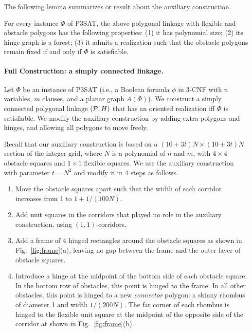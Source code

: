 \documentclass{llncs}
\newcommand{\PP}{{\cal P}} %
\begin{document}
The following lemma summarizes or result about the auxiliary construction.
\begin{lemma}\label{lem:aux}
For every instance $\Phi$ of P3SAT, the above polygonal linkage with flexible and obstacle polygons
has the following properties: (1) it has polynomial size; (2) its hinge graph is a forest;
(3) it admits a realization such that the obstacle polygons remain fixed if and only if $\Phi$ is satisfiable.
\end{lemma}

\paragraph{Full Construction: a simply connected linkage.}
Let $\Phi$ be an instance of P3SAT (i.e., a Boolean formula $\phi$
in 3-CNF with $n$ variables, $m$ clauses, and a planar graph $A(\Phi)$).
We construct a simply connected polygonal linkage $(\PP,H)$ that has an oriented
realization iff $\Phi$ is satisfiable. We modify the auxiliary construction
by adding extra polygons and hinges, and allowing all polygons to move freely.

Recall that our auxiliary construction is based on a $(10+3t)N\times (10+3t)N$ section of the integer grid, where $N$ is a polynomial of $n$ and $m$, with $4\times 4$ obstacle squares and $1\times 1$ flexible squares. We use the auxiliary construction with parameter $t=N^2$ and modify it in 4 steps as follows.

\begin{enumerate}
\item Move the obstacle squares apart such that the width of each corridor increases from 1 to $1+1/(100N)$.
\item Add unit squares in the corridors that played no role in the auxiliary construction, using $(1,1)$-corridors.
\item Add a frame of 4 hinged rectangles around the obstacle squares as shown in Fig.~\ref{fig:frame}(a),
leaving no gap between the frame and the outer layer of obstacle squares.
\item Introduce a hinge at the midpoint of the bottom side of each obstacle square.
In the bottom row of obstacles, this point is hinged to the frame.
In all other obstacles, this point is hinged to a new \emph{connector}
polygon: a skinny rhombus of diameter 1 and width $1/(200N)$.
The far corner of each rhombus is hinged to the flexible unit square
at the midpoint of the opposite side of the corridor at shown
in Fig.~\ref{fig:frame}(b).
\end{enumerate}
\end{document}
